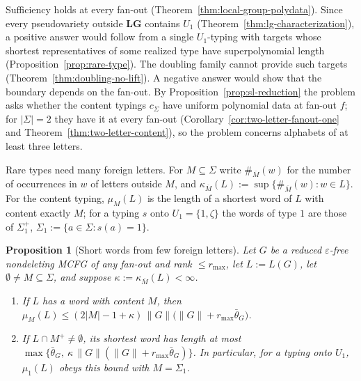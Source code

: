\documentclass[11pt]{article}
\numberwithin{equation}{section}
\theoremstyle{plain}
\newtheorem{proposition}[theorem]{Proposition}
\theoremstyle{definition}
\theoremstyle{remark}
\newcommand{\eps}{\varepsilon}
\theoremstyle{plain}
\begin{document}
Sufficiency holds at every fan-out
(Theorem~\ref{thm:local-group-polydata}).
Since every pseudovariety outside $\mathbf{LG}$
contains $U_1$ (Theorem~\ref{thm:lg-characterization}),
a positive answer would follow from a single
$U_1$-typing with targets whose shortest representatives
of some realized type have superpolynomial length
(Proposition~\ref{prop:rare-type}).
The doubling family cannot provide such targets
(Theorem~\ref{thm:doubling-no-lift}).
A negative answer would show that the boundary depends on the
fan-out.  By Proposition~\ref{prop:sl-reduction} the problem asks whether the
content typings $c_\Sigma$ have uniform polynomial data at fan-out $f$; for
$|\Sigma|=2$ they have it at every fan-out
(Corollary~\ref{cor:two-letter-fanout-one} and Theorem~\ref{thm:two-letter-content}),
so the problem concerns alphabets of at least three letters.

Rare types need many foreign letters.  For $M\subseteq\Sigma$ write
$\#_{\overline M}(w)$ for the number of occurrences in $w$ of letters outside $M$, and
$\kappa_{\overline M}(L):=\sup\{\#_{\overline M}(w):w\in L\}$.  For the content typing,
$\mu_M(L)$ is the length of a shortest word of $L$ with content exactly $M$; for a
typing $s$ onto $U_1=\{1,\zeta\}$ the words of type $1$ are those of $\Sigma_1^+$,
$\Sigma_1:=\{a\in\Sigma:s(a)=1\}$.

\begin{proposition}[Short words from few foreign letters]
\label{prop:zeta-capacity}
Let $G$ be a reduced $\eps$-free nondeleting MCFG of any fan-out and rank
$\le r_{\max}$, let $L:=L(G)$, let $\emptyset\ne M\subseteq\Sigma$, and suppose
$\kappa:=\kappa_{\overline M}(L)<\infty$.
\begin{enumerate}[label=\textup{(\roman*)},leftmargin=*]
\item If $L$ has a word with content $M$, then
$\mu_M(L)\le(2|M|-1+\kappa)\,\|G\|\bigl(\|G\|+r_{\max}\bar\theta_G\bigr)$.
\item If $L\cap M^+\ne\emptyset$, its shortest word has length at most
$\max\{\bar\theta_G,\ \kappa\,\|G\|(\|G\|+r_{\max}\bar\theta_G)\}$.  In particular,
for a typing onto $U_1$, $\mu_1(L)$ obeys this bound with $M=\Sigma_1$.
\end{enumerate}
\end{proposition}
\end{document}
